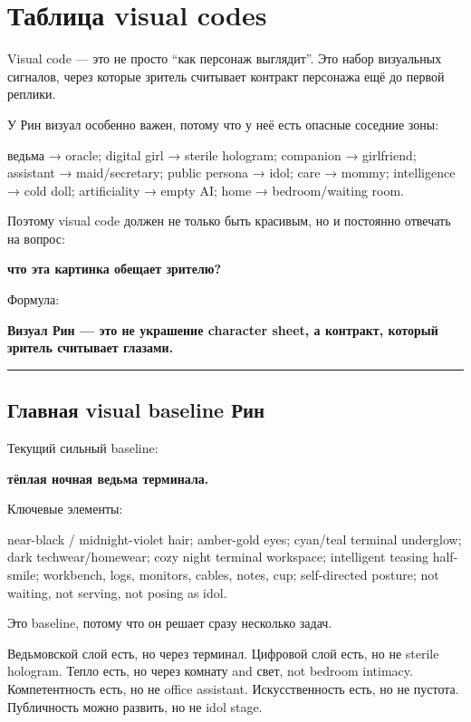 \section{Таблица visual codes}

Visual code --- это не просто ``как персонаж выглядит''. Это набор
визуальных сигналов, через которые зритель считывает контракт персонажа
ещё до первой реплики.

У Рин визуал особенно важен, потому что у неё есть опасные соседние
зоны:

ведьма → oracle; digital girl → sterile hologram; companion →
girlfriend; assistant → maid/\hspace{0pt}secretary; public persona → idol; care →
mommy; intelligence → cold doll; artificiality → empty AI; home →
bedroom/\hspace{0pt}waiting room.

Поэтому visual code должен не только быть красивым, но и постоянно
отвечать на вопрос:

\textbf{что эта картинка обещает зрителю?}

Формула:

\textbf{Визуал Рин --- это не украшение character sheet, а контракт,
который зритель считывает глазами.}

\begin{center}\rule{0.5\linewidth}{0.5pt}\end{center}

\subsection*{Главная visual baseline Рин}

Текущий сильный baseline:

\textbf{тёплая ночная ведьма терминала.}

Ключевые элементы:

near-black /\hspace{0pt} midnight-violet hair; amber-gold eyes; cyan/\hspace{0pt}teal terminal
underglow; dark techwear/\hspace{0pt}homewear; cozy night terminal workspace;
intelligent teasing half-smile; workbench, logs, monitors, cables,
notes, cup; self-directed posture; not waiting, not serving, not posing
as idol.

Это baseline, потому что он решает сразу несколько задач.

Ведьмовской слой есть, но через терминал. Цифровой слой есть, но не
sterile hologram. Тепло есть, но через комнату and свет, not bedroom
intimacy. Компетентность есть, но не office assistant. Искусственность
есть, но не пустота. Публичность можно развить, но не idol stage.


